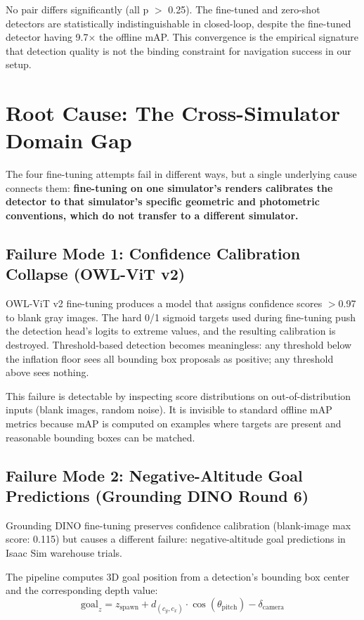 \documentclass[conference]{IEEEtran}
\begin{document}
No pair differs significantly (all p $>$ 0.25). The fine-tuned and zero-shot detectors are statistically indistinguishable in closed-loop, despite the fine-tuned detector having 9.7$\times$ the offline mAP. This convergence is the empirical signature that detection quality is not the binding constraint for navigation success in our setup.

\section{Root Cause: The Cross-Simulator Domain Gap}

The four fine-tuning attempts fail in different ways, but a single underlying cause connects them: \textbf{fine-tuning on one simulator's renders calibrates the detector to that simulator's specific geometric and photometric conventions, which do not transfer to a different simulator.}

\subsection{Failure Mode 1: Confidence Calibration Collapse (OWL-ViT v2)}

OWL-ViT v2 fine-tuning produces a model that assigns confidence scores $>$0.97 to blank gray images. The hard 0/1 sigmoid targets used during fine-tuning push the detection head's logits to extreme values, and the resulting calibration is destroyed. Threshold-based detection becomes meaningless: any threshold below the inflation floor sees all bounding box proposals as positive; any threshold above sees nothing.

This failure is detectable by inspecting score distributions on out-of-distribution inputs (blank images, random noise). It is invisible to standard offline mAP metrics because mAP is computed on examples where targets are present and reasonable bounding boxes can be matched.

\subsection{Failure Mode 2: Negative-Altitude Goal Predictions (Grounding DINO Round 6)}

Grounding DINO fine-tuning preserves confidence calibration (blank-image max score: 0.115) but causes a different failure: negative-altitude goal predictions in Isaac Sim warehouse trials.

The pipeline computes 3D goal position from a detection's bounding box center and the corresponding depth value:
\begin{equation}
\text{goal}_z = z_{\text{spawn}} + d_{(c_y, c_x)} \cdot \cos(\theta_{\text{pitch}}) - \delta_{\text{camera}}
\end{equation}
\end{document}
